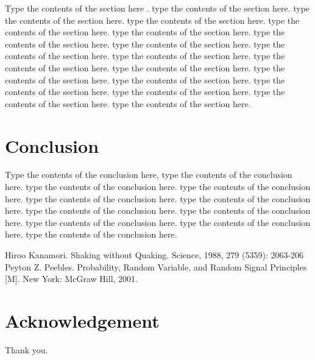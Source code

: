 \documentclass[twoside,twocolumn]{article}
\begin{document}
Type the contents of the section here \cite{Kanamori:1988} \cite{Peebles:2001}.  type the contents of the section here.  type the contents of the section here.  type the contents of the section here.  type the contents of the section here.  type the contents of the section here.  type the contents of the section here.  type the contents of the section here.  type the contents of the section here. type the contents of the section here.  type the contents of the section here.  type the contents of the section here.  type the contents of the section here.  type the contents of the section here.  type the contents of the section here.  type the contents of the section here.  type the contents of the section here.  type the contents of the section here.  

\section{Conclusion}

Type the contents of the conclusion here, type the contents of the conclusion here. type the contents of the conclusion here. type the contents of the conclusion here. type the contents of the conclusion here. type the contents of the conclusion here.  type the contents of the conclusion here.  type the contents of the conclusion here. type the contents of the conclusion here. type the contents of the conclusion here. type the contents of the conclusion here.


\begin{thebibliography}{99} %

Hiroo Kanamori.
\newblock Shaking without Quaking. Science, 1988, 279 (5359): 2063-206
Peyton Z. Peebles.
\newblock Probability, Random Variable, and Random Signal Principles [M]. New York: McGraw Hill, 2001.
 
\end{thebibliography}


\section*{Acknowledgement}
	
Thank you.	

\end{document}
